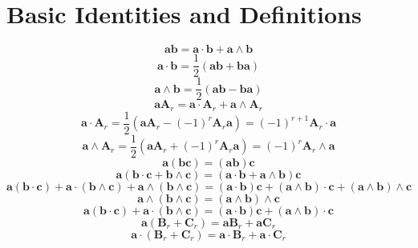 \documentclass[11pt, a4paper, fleqn]{report}
\numberwithin{equation}{section}
\begin{document}
\section{Basic Identities and Definitions}
\begin{equation}
    \mathbf{a}\mathbf{b}=\mathbf{a}\cdot\mathbf{b}+\mathbf{a}\wedge\mathbf{b}
\end{equation}
\begin{equation}
    \mathbf{a}\cdot\mathbf{b}=\frac{1}{2}(\mathbf{a}\mathbf{b}+\mathbf{b}\mathbf{a})
\end{equation}
\begin{equation}
    \mathbf{a}\wedge\mathbf{b}=\frac{1}{2}(\mathbf{a}\mathbf{b}-\mathbf{b}\mathbf{a})
\end{equation}
\begin{equation}
    \mathbf{a}\mathbf{A}_r=\mathbf{a}\cdot\mathbf{A}_r+\mathbf{a}\wedge\mathbf{A}_r
\end{equation}
\begin{equation}
    \mathbf{a}\cdot\mathbf{A}_r=\frac{1}{2}(\mathbf{a}\mathbf{A}_r-(-1)^r\mathbf{A}_r\mathbf{a})=(-1)^{r+1}\mathbf{A}_r\cdot\mathbf{a}
\end{equation}
\begin{equation}
    \mathbf{a}\wedge\mathbf{A}_r=\frac{1}{2}(\mathbf{a}\mathbf{A}_r+(-1)^r\mathbf{A}_r\mathbf{a})=(-1)^{r}\mathbf{A}_r\wedge\mathbf{a}
\end{equation}
\[
    \mathbf{a}(\mathbf{b}\mathbf{c})=(\mathbf{a}\mathbf{b})\mathbf{c}
\]
\[
    \mathbf{a}(\mathbf{b}\cdot\mathbf{c}+\mathbf{b}\wedge\mathbf{c})=(\mathbf{a}\cdot\mathbf{b}+\mathbf{a}\wedge\mathbf{b})\mathbf{c}
\]
\[
    \mathbf{a}(\mathbf{b}\cdot\mathbf{c})+\mathbf{a}\cdot(\mathbf{b}\wedge\mathbf{c})+\mathbf{a}\wedge(\mathbf{b}\wedge\mathbf{c})=(\mathbf{a}\cdot\mathbf{b})\mathbf{c}+(\mathbf{a}\wedge\mathbf{b})\cdot\mathbf{c}+(\mathbf{a}\wedge\mathbf{b})\wedge\mathbf{c}
\]
\begin{equation}
    \mathbf{a}\wedge(\mathbf{b}\wedge\mathbf{c})=(\mathbf{a}\wedge\mathbf{b})\wedge\mathbf{c}
\end{equation}
\begin{equation}
    \mathbf{a}(\mathbf{b}\cdot\mathbf{c})+\mathbf{a}\cdot(\mathbf{b}\wedge\mathbf{c})=(\mathbf{a}\cdot\mathbf{b})\mathbf{c}+(\mathbf{a}\wedge\mathbf{b})\cdot\mathbf{c}
\end{equation}
\[
    \mathbf{a}(\mathbf{B}_r+\mathbf{C}_r)=\mathbf{a}\mathbf{B}_r+\mathbf{a}\mathbf{C}_r
\]
\begin{equation}\tag{2.1.9a}
    \mathbf{a}\cdot(\mathbf{B}_r+\mathbf{C}_r)=\mathbf{a}\cdot\mathbf{B}_r+\mathbf{a}\cdot\mathbf{C}_r
\end{equation}
\end{document}
